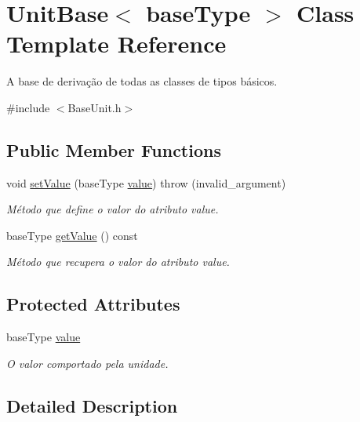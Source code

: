 \hypertarget{classUnitBase}{\section{Unit\-Base$<$ base\-Type $>$ Class Template Reference}
\label{d5/db5/classUnitBase}
}


A base de derivação de todas as classes de tipos básicos.  




{\ttfamily \#include $<$Base\-Unit.\-h$>$}

\subsection*{Public Member Functions}
\begin{DoxyCompactItemize}
\item 
void \hyperlink{classUnitBase_a9cd392786b8078ab713045a8d1dece52}{set\-Value} (base\-Type \hyperlink{classUnitBase_a1c1ad08b45f07a94e5cf71dee734436b}{value})  throw (invalid\-\_\-argument)
\begin{DoxyCompactList}\small\item\em Método que define o valor do atributo value. \end{DoxyCompactList}\item 
base\-Type \hyperlink{classUnitBase_a6b4041c7176acb6c4956e085603449d1}{get\-Value} () const 
\begin{DoxyCompactList}\small\item\em Método que recupera o valor do atributo value. \end{DoxyCompactList}\end{DoxyCompactItemize}
\subsection*{Protected Attributes}
\begin{DoxyCompactItemize}
\item 
base\-Type \hyperlink{classUnitBase_a1c1ad08b45f07a94e5cf71dee734436b}{value}
\begin{DoxyCompactList}\small\item\em O valor comportado pela unidade. \end{DoxyCompactList}\end{DoxyCompactItemize}


\subsection{Detailed Description}

